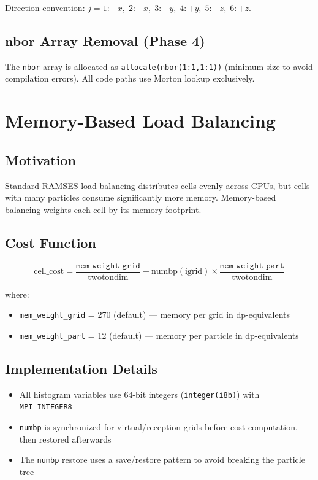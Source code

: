 \documentclass[11pt,fleqn]{book}
\begin{document}
Direction convention: $j = 1{:}{-x},\; 2{:}{+x},\; 3{:}{-y},\; 4{:}{+y},\; 5{:}{-z},\; 6{:}{+z}$.

\section{nbor Array Removal (Phase 4)}

The \texttt{nbor} array is allocated as \texttt{allocate(nbor(1:1,1:1))} (minimum size to avoid compilation errors). All code paths use Morton lookup exclusively.


\chapter{Memory-Based Load Balancing}

\section{Motivation}

Standard RAMSES load balancing distributes cells evenly across CPUs, but cells with many particles consume significantly more memory. Memory-based balancing weights each cell by its memory footprint.

\section{Cost Function}

\[
\text{cell\_cost} = \frac{\texttt{mem\_weight\_grid}}{\text{twotondim}} + \text{numbp}(\text{igrid}) \times \frac{\texttt{mem\_weight\_part}}{\text{twotondim}}
\]

where:
\begin{itemize}[leftmargin=2em]
  \item \texttt{mem\_weight\_grid} = 270 (default) --- memory per grid in dp-equivalents
  \item \texttt{mem\_weight\_part} = 12 (default) --- memory per particle in dp-equivalents
\end{itemize}

\section{Implementation Details}

\begin{itemize}[leftmargin=2em]
  \item All histogram variables use 64-bit integers (\texttt{integer(i8b)}) with \texttt{MPI\_INTEGER8}
  \item \texttt{numbp} is synchronized for virtual/reception grids before cost computation, then restored afterwards
  \item The \texttt{numbp} restore uses a save/restore pattern to avoid breaking the particle tree
\end{itemize}
\end{document}
